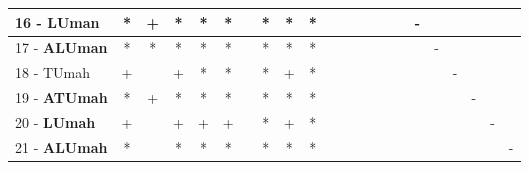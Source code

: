 \begin{table}[h]
\begin{center}
\begin{tabular}{lcc|cc|cc|cc|cc|cc|cc|cc|cc|cc|c}
16 - \textbf{LUman}	& * & + & * & * & * &   & * & * & * &   &   &   &   &   &   & - &   &   &   &   &   \\ \hline
17 - \textbf{ALUman}	& * & * & * & * & * &   & * & * & * &   &   &   &   &   &   &   & - &   &   &   &   \\
18 - TUmah	& + &   & + & * & * &   & * & + & * &   &   &   &   &   &   &   &   & - &   &   &   \\ \hline
19 - \textbf{ATUmah}	& * & + & * & * & * &   & * & * & * &   &   &   &   &   &   &   &   &   & - &   &   \\
20 - \textbf{LUmah}	& + &   & + & + & + &   & * & + & * &   &   &   &   &   &   &   &   &   &   & - &   \\ \hline
21 - \textbf{ALUmah}	& * &   & * & * & * &   & * & * & * &   &   &   &   &   &   &   &   &   &   &   & - \\\end{tabular}
\label{stratsALCKappaFried5NN}
\end{center}
\end{table}